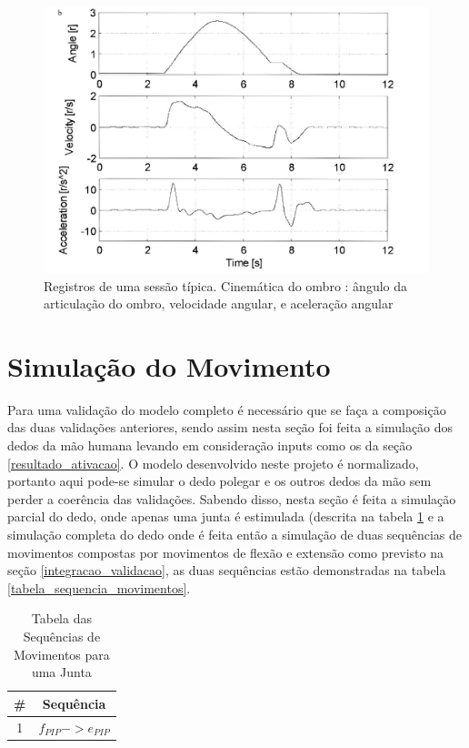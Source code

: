 \begin{figure}[H]
\centering
\includegraphics[width = 1\textwidth]{img/Rosen1999_ativacao.JPG}
\caption[Resposta ao Movimento de Flexão seguido de Extensão em um Ombro]{Registros de uma sessão típica. Cinemática do ombro : ângulo da articulação do ombro, velocidade angular, e aceleração angular \cite{rosen1999performances}}
\label{rosen_ativacao}
\end{figure}

\section{Simulação do Movimento}
\label{resultado_simulacao}
Para uma validação do modelo completo é necessário que se faça a composição das duas validações anteriores, sendo assim nesta seção foi feita a simulação dos dedos da mão humana levando em consideração inputs como os da seção \ref{resultado_ativacao}. O modelo desenvolvido neste projeto é normalizado, portanto aqui pode-se simular o dedo polegar e os outros dedos da mão sem perder a coerência das validações. Sabendo disso, nesta seção é feita a simulação parcial do dedo, onde apenas uma junta é estimulada (descrita na tabela \ref{tabela_seq_uma} e a simulação completa do dedo onde é feita então a simulação de duas sequências de movimentos compostas por movimentos de flexão e extensão como previsto na seção \ref{integracao_validacao}, as duas sequências estão demonstradas na tabela \ref{tabela_sequencia_movimentos}.

\begin{table}[H]
\centering
\caption{Tabela das Sequências de Movimentos para uma Junta}
\label{tabela_seq_uma}
\begin{tabular}{|c|c|}
	\hline
    \# & Sequência \\ \hline
    1 & $f_{PIP} -> e_{PIP}$ \\ \hline
\end{tabular}
\end{table}

